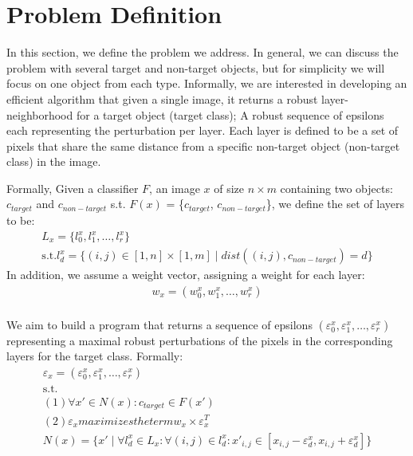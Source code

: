 
\section{Problem Definition}
In this section, we define the problem we address.
In general, we can discuss the problem with several target and non-target objects, but for simplicity we will focus on one object from each type.
Informally, we are interested in developing an efficient algorithm that given a single image, it returns a robust layer-neighborhood for a target object (target class);
A robust sequence of epsilons each representing the perturbation per layer.
Each layer is defined to be a set of pixels that share the same distance from a specific non-target object (non-target class) in the image.

Formally, Given a classifier $F$, an image $x$ of size $n\times m$ containing two objects: $c_{target}$ and $c_{non-target}$ \textrm{s.t.} $F(x)$ = \{$c_{target}$, $c_{non-target}$\},
we define the set of layers to be:
\begin{gather*}
    L_x = \{l_0^x, l_1^x, \ldots, l_r^x\}\\
    \textrm{s.t.}  l_d^x = \{(i,j) \in [1,n]\times [1,m] \mid dist((i, j), c_{non-target}) = d\}
\end{gather*}
In addition, we assume a weight vector, assigning a weight for each layer:
\begin{gather*}
    w_x = (w_0^x, w_1^x, \ldots, w_r^x)\\
\end{gather*}

We aim to build a program that returns a sequence of epsilons $(\varepsilon_0^x, \varepsilon_1^x, \ldots, \varepsilon_r^x)$ representing a maximal robust perturbations of the pixels in the corresponding layers for the target class.
Formally:
\begin{gather*}
    \varepsilon_x = (\varepsilon_0^x, \varepsilon_1^x, \ldots, \varepsilon_r^x)\\
    \textrm{s.t.}\\
    (1)  \forall x' \in N(x): c_{target} \in F(x')\\
    (2)  \varepsilon_x  maximizes the term  w_x \times \varepsilon_x^T\\
    N(x) = \{x' \mid \forall l_d^x\in L_x: \forall (i,j)\in l_d^x: x'_{i,j} \in [x_{i,j}-\varepsilon_d^x, x_{i,j}+\varepsilon_d^x]\}\\
\end{gather*}
